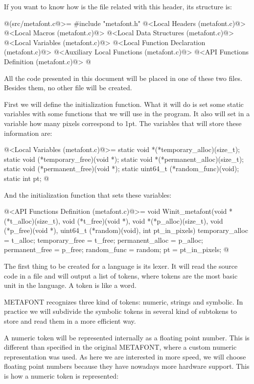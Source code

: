 If you want to know how is the  file related
with this header, its structure is:

\iniciocodigo
@(src/metafont.c@>=
#include "metafont.h"
@<Local Headers (metafont.c)@>
@<Local Macros (metafont.c)@>
@<Local Data Structures (metafont.c)@>
@<Local Variables (metafont.c)@>
@<Local Function Declaration (metafont.c)@>
@<Auxiliary Local Functions (metafont.c)@>
@<API Functions Definition (metafont.c)@>
@
\fimcodigo

All the code presented in this document will be placed in one of these
two files. Besides them, no other file will be created.


First we will define the initialization function. What it will do is
set some static variables with some functions that we will use in the
program. It also will set in a variable how many pixels correspond to
1pt. The variables that will store these information are:

\iniciocodigo
@<Local Variables (metafont.c)@>=
static void *(*temporary_alloc)(size_t);
static void (*temporary_free)(void *);
static void *(*permanent_alloc)(size_t);
static void (*permanent_free)(void *);
static uint64_t (*random_func)(void);
static int pt;
@
\fimcodigo

And the initialization function that sets these variables:

\iniciocodigo
@<API Functions Definition (metafont.c)@>=
void Winit_metafont(void *(*t_alloc)(size_t),
                    void (*t_free)(void *),
                    void *(*p_alloc)(size_t),
                    void (*p_free)(void *),
                    uint64_t (*random)(void), int pt_in_pixels){
  temporary_alloc = t_alloc;
  temporary_free = t_free;
  permanent_alloc = p_alloc;
  permanent_free = p_free;
  random_func = random;
  pt = pt_in_pixels;
}
@
\fimcodigo



The first thing to be created for a language is its lexer. It will
read the source code in a file and will output a list of tokens, where
tokens are the most basic unit in the language. A token is like a
word.

METAFONT recognizes three kind of tokens: numeric, strings and
symbolic. In practice we will subdivide the symbolic tokens in several
kind of subtokens to store and read them in a more efficient way.

A numeric token will be represented internally as a floating point
number. This is different than specified in the original METAFONT,
where a custom numeric representation was used. As here we are
interested in more speed, we will choose floating point numbers
because they have nowadays more hardware support. This is how a
numeric token is represented:

